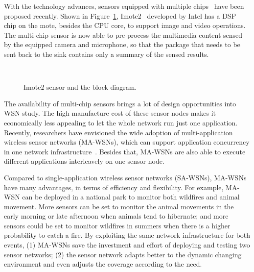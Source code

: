 With the technology advances, sensors equipped with multiple chips~\cite{imote2} have been proposed recently. Shown in Figure~\ref{fig:imote2}, Imote2~\cite{imote2} developed by Intel has a DSP chip on the mote, besides the CPU core, to support image and video operations. The multi-chip sensor is now able to pre-process the multimedia content sensed by the equipped camera and microphone, so that the package that needs to be sent back to the sink contains only a summary of the sensed results.

\begin{figure}[h]
\centering
\mbox{
	\hspace{20mm}
      }
\caption{Imote2 sensor and the block diagram.}
\label{fig:imote2}
\end{figure}

The availability of multi-chip sensors  brings a lot of design opportunities into WSN study. The high manufacture cost of these sensor nodes makes it economically less appealing to let the whole network run just one application. Recently, researchers have envisioned the wide adoption of multi-application wireless sensor networks (MA-WSNs), which can support application concurrency in one network infrastructure~\cite{melete,ma-wsns}. Besides that, MA-WSNs are also able to execute different applications interleavely on one sensor node.


Compared to single-application wireless sensor networks (SA-WSNs), MA-WSNs have many advantages, in terms of efficiency and flexibility.
For example, MA-WSN can be deployed in a national park to monitor both wildfires and animal movement. More sensors can be set to monitor the animal movements in the early morning or late afternoon when animals tend to hibernate; and more sensors could be set to monitor wildfires in summers when there is a higher probability to catch a fire. By exploiting the same network infrastructure for both events, (1) MA-WSNs save the investment and effort of deploying and testing two sensor networks; (2) the sensor network adapts better to the dynamic changing environment and even adjusts the coverage according to the need.

